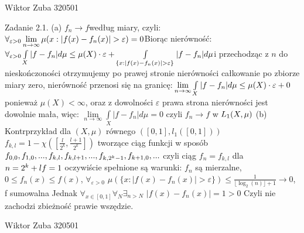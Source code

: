 \documentclass{article}
\begin{document}
 
Wiktor Zuba 320501
\newline

Zadanie 2.1.
\newline
\newline
(a)\newline
$
f_n\rightarrow f $według miary, czyli: $\forall_{\varepsilon>0}\lim\limits_{n\rightarrow\infty}\mu({x:|f(x)-f_n(x)|>\varepsilon})=0\newline
$Biorąc nierówność: $\forall_{\varepsilon>0}\int\limits_{X}|f-f_n|d\mu\le\mu(X)\cdot\varepsilon+\int\limits_{\{x:|f(x)-f_n(x)|>\varepsilon\}}|f-f_n|d\mu\newline
$i przechodząc z $n$ do nieskończoności otrzymujemy po prawej stronie nierówności całkowanie po zbiorze miary zero, nierówność przenosi się na granicę:$\newline
\lim\limits_{n\rightarrow\infty}\int\limits_{X}|f-f_n|d\mu\le\mu(X)\cdot\varepsilon+0\newline$
ponieważ $\mu(X)<\infty$, oraz z dowolności $\varepsilon$ prawa strona nierówności jest dowolnie mała, więc:\newline
$\lim\limits_{n\rightarrow\infty}\int\limits_{X}|f-f_n|d\mu=0$ czyli $f_n\rightarrow f$ w $ L_1(X,\mu)\newline\newline$
(b)\newline
Kontrprzykład dla $(X,\mu)$ równego $([0,1],l_1([0,1]))$\newline
$f_{k,l}=1-\chi([\frac{l}{2^k},\frac{l+1}{2^k}])$ tworzące ciąg funkcji w sposób $f_{0,0},f_{1,0},...,f_{k,l},f_{k,l+1},...,f_{k,2^{k}-1},f_{k+1,0},...\newline
$ czyli ciąg $f_n=f_{k,l}$ dla $n=2^k+l\newline
f=1$ oczywiście spełnione są warunki: $f_n$ są mierzalne, $0\le f_n(x)\le f(x)$,\newline
$\forall_{\varepsilon>0}$ $\mu(\{x:|f(x)-f_n(x)|>\varepsilon\})\le\frac{1}{\lfloor\log_2(n)\rfloor+1}\rightarrow 0$, f sumowalna\newline
Jednak $\forall_{x\in[0,1]}\forall_{N}\exists_{n>N}$ $|f(x)-f_n(x)|=1>0$\newline
Czyli nie zachodzi zbieżność prawie wszędzie.\newpage
 
Wiktor Zuba 320501
\newline
\end{document}
